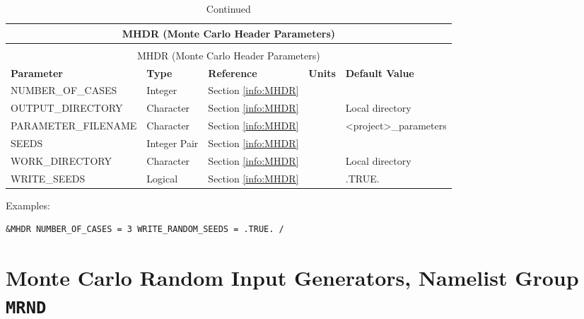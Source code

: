 \noindent
\renewcommand{\tabcolsep}{.1in}
\begin{longtable}{|l|l|l|l|l|}
\caption[Monte Carlo Header Parameters ({\ct MHDR} namelist group)]{For more information see Section~\ref{info:MHDR}.}
\label{tbl:MHDR} \\
\hline
\multicolumn{5}{|c|}{{\ct MHDR} (Monte Carlo Header Parameters)} \\
\hline \hline
\endfirsthead
\caption[]{Continued} \\
\hline
\multicolumn{5}{|c|}{{\ct MHDR} (Monte Carlo Header Parameters)} \\
\hline \hline
\endhead
\small
\parbox{1.5in}{\bf Parameter}    & \parbox{1in}{\bf Type}  & \parbox{1in}{\bf Reference}  & \parbox{1in}{\bf Units}  & \parbox{1in}{\bf Default Value} \\ \hline
{\ct NUMBER\_OF\_CASES}          & Integer        & Section \ref{info:MHDR}   &     &                          \\ \hline
{\ct OUTPUT\_DIRECTORY}          & Character      & Section \ref{info:MHDR}   &     & Local directory          \\ \hline
{\ct PARAMETER\_FILENAME}        & Character      & Section \ref{info:MHDR}   &     & <project>\_parameters   \\ \hline
{\ct SEEDS}                      & Integer Pair   & Section \ref{info:MHDR}   &     &                          \\ \hline
{\ct WORK\_DIRECTORY}            & Character      & Section \ref{info:MHDR}   &     & Local directory          \\ \hline
{\ct WRITE\_SEEDS}               & Logical        & Section \ref{info:MHDR}   &     & {\ct .TRUE.}             \\ \hline
\end{longtable}

\noindent Examples:
\begin{lstlisting}
&MHDR NUMBER_OF_CASES = 3 WRITE_RANDOM_SEEDS = .TRUE. /
\end{lstlisting}


\clearpage

\section{Monte Carlo Random Input Generators, Namelist Group \texorpdfstring{{\tt MRND}}{MRND}}

